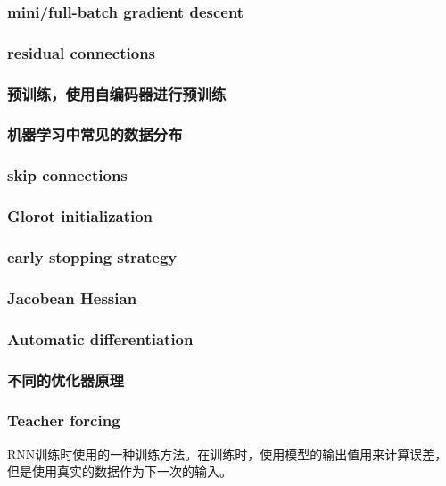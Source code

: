 \subsubsection{mini/full-batch gradient descent}

\subsubsection{residual connections}

\subsubsection{预训练，使用自编码器进行预训练}

\subsubsection{机器学习中常见的数据分布}

\subsubsection{skip connections}

\subsubsection{Glorot initialization}

\subsubsection{early stopping strategy}

\subsubsection{Jacobean Hessian}


\subsubsection{Automatic differentiation} 

\subsubsection{不同的优化器原理}

\subsubsection{Teacher forcing}     RNN训练时使用的一种训练方法。在训练时，使用模型的输出值用来计算误差，但是使用真实的数据作为下一次的输入。

